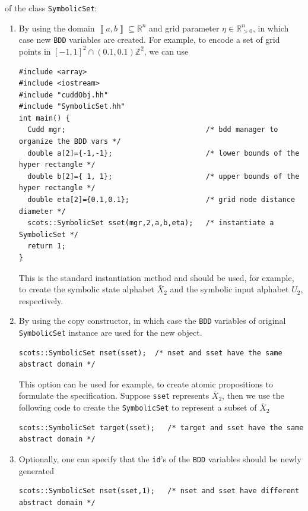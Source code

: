 \documentclass[a4paper]{amsart}
\newcommand{\segcc}[1]{\ensuremath{{\left\llbracket#1\right\rrbracket}}}
\newcommand{\intcc}[1]{\ensuremath{{\left[#1\right]}}}
\newcommand{\R}{\mathbb{R}}
\newcommand{\Z}{\mathbb{Z}}
\begin{document}
of the class {\tt\small SymbolicSet}:
\begin{enumerate}
  \item By using the domain $\segcc{a,b}\subseteq \R^n$ and grid parameter
    $\eta\in\R^n_{>0}$, in which case new {\tt\small BDD} variables are created.
    For example, to encode a set of grid points in $\intcc{-1,1}^2\cap
    (0.1,0.1)\Z^2$, we can use
\begin{lstlisting}[basicstyle=\footnotesize\ttfamily]
#include <array>
#include <iostream>
#include "cuddObj.hh"
#include "SymbolicSet.hh"
int main() {
  Cudd mgr;                                 /* bdd manager to organize the BDD vars */    
  double a[2]={-1,-1};                      /* lower bounds of the hyper rectangle */
  double b[2]={ 1, 1};                      /* upper bounds of the hyper rectangle */
  double eta[2]={0.1,0.1};                  /* grid node distance diameter */
  scots::SymbolicSet sset(mgr,2,a,b,eta);   /* instantiate a SymbolicSet */
  return 1;
}
\end{lstlisting}
    This is the standard instantiation method and should be used, for example, to create
    the symbolic state alphabet $\bar X_2$ and the symbolic input alphabet $U_2$, respectively.
  \item By using the copy constructor, in which case the {\tt\small BDD} variables of original
    {\tt\small SymbolicSet} instance are used for the new object.
\begin{lstlisting}[basicstyle=\footnotesize\ttfamily]
  scots::SymbolicSet nset(sset);  /* nset and sset have the same abstract domain */
\end{lstlisting}
    This option can be used for example, to create atomic propositions to
    formulate the specification. Suppose {\tt\small sset} represents $\bar X_2$,
    then we use the following code to create the {\tt\small SymbolicSet} to represent a
    subset of $\bar X_2$
\begin{lstlisting}[basicstyle=\footnotesize\ttfamily]
  scots::SymbolicSet target(sset);   /* target and sset have the same abstract domain */
\end{lstlisting}
  \item Optionally, one can specify that the {\tt\small id}'s of the {\tt\small BDD} variables should be
    newly generated
\begin{lstlisting}[basicstyle=\footnotesize\ttfamily]
  scots::SymbolicSet nset(sset,1);   /* nset and sset have different abstract domain */
\end{lstlisting}

\end{enumerate}
\end{document}
